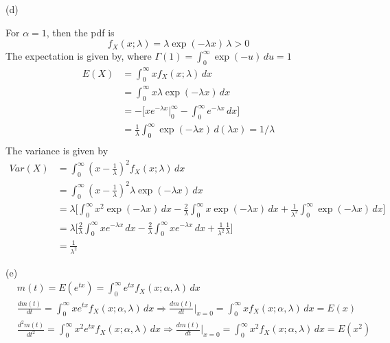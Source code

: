 \documentclass[letterpaper, 11pt]{article}
\newcommand{\1}{\mathds{1}}	%
\theoremstyle{definition}
\begin{document}
(d)

For $\alpha = 1$, then the pdf is \[
    f_X(x;\lambda) = \lambda\exp(-\lambda x) \, \lambda > 0
\]
The expectation is given by, where $\Gamma(1) = \int_{0}^{\infty } \exp(-u) \, du = 1 $ \begin{align*}
    E(X) & = \int_{0}^{\infty } xf_X(x;\lambda) \, dx                                                \\
         & = \int_{0}^{\infty } x\lambda\exp(-\lambda x) \, dx                                       \\
         & = - \Big[ xe^{-\lambda x} \Big|_0^\infty  - \int_{0}^{\infty } e^{-\lambda x} \, dx \Big] \\
         & = \frac{1}{\lambda} \int_{0}^{\infty } \exp(-\lambda x) \, d(\lambda x) = 1/\lambda       \\
\end{align*}
The variance is given by \begin{align*}
    Var(X) & = \int_{0}^{\infty } (x- \frac{1}{\lambda})^{2}f_X(x ; \lambda) \, dx                                                                                                                              \\
           & = \int_{0}^{\infty } (x- \frac{1}{\lambda})^{2} \lambda\exp(-\lambda x) \, dx                                                                                                                      \\
           & = \lambda\Big[\int_{0}^{\infty } x^2 \exp(-\lambda x) \, dx -\frac{2}{\lambda}\int_{0}^{\infty } x \exp(-\lambda x) \, dx + \frac{1}{\lambda ^{2}} \int_{0}^{\infty } \exp(-\lambda x) \, dx \Big] \\
           & = \lambda \Big[ \frac{2}{\lambda} \int_{0}^{\infty } x e^{-\lambda x} \, dx  - \frac{2}{\lambda} \int_{0}^{\infty } x e^{-\lambda x} \, dx + \frac{1}{\lambda ^{2}} \frac{1}{\lambda} \Big]        \\
           & = \frac{1}{\lambda ^{2}}
\end{align*}

(e)
\begin{align*}
     & m(t) = E(e^{tx}) = \int_{0}^{\infty } e^{tx} f_X(x;\alpha,\lambda) \, dx                                                                                                                  \\
     & \frac{d m(t)}{dt} = \int_{0}^{\infty } xe^{tx}f_X(x;\alpha,\lambda) \, dx \Longrightarrow \frac{d m(t)}{dt}\Big|_{x=0} = \int_{0}^{\infty } xf_X(x;\alpha,\lambda) \, dx = E(x)           \\
     & \frac{d^2 m(t)}{dt^2} = \int_{0}^{\infty } x^2e^{tx}f_X(x;\alpha,\lambda) \, dx \Longrightarrow \frac{d m(t)}{dt}\Big|_{x=0} = \int_{0}^{\infty } x^2f_X(x;\alpha,\lambda) \, dx = E(x^2) \\
\end{align*}
\end{document}
